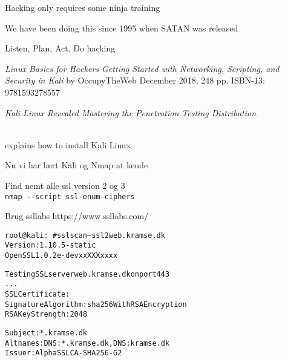 \documentclass[Screen16to9,17pt]{foils}
\begin{document}
\begin{list2}
\item Hacking only requires some ninja training
\item We have been doing this since 1995 when SATAN was released
\item Listen, Plan, Act, Do hacking
\end{list2}



\emph{Linux Basics for Hackers
Getting Started with Networking, Scripting, and Security in Kali}
by OccupyTheWeb
December 2018, 248 pp.
ISBN-13:
9781593278557




\emph{Kali Linux Revealed  Mastering the Penetration Testing Distribution}

\\
explains how to install Kali Linux






\begin{list1}
\item Nu vi har lært Kali og Nmap at kende
\begin{list2}
\item Find nemt alle ssl version 2 og 3\\
\verb+nmap --script ssl-enum-ciphers+
\item Brug ssllabs https://www.ssllabs.com/
\end{list2}
\end{list1}



\begin{alltt}\small
root@kali:~# sslscan --ssl2 web.kramse.dk
Version: 1.10.5-static
OpenSSL 1.0.2e-dev xx XXX xxxx

Testing SSL server web.kramse.dk on port 443
...
  SSL Certificate:
Signature Algorithm: sha256WithRSAEncryption
RSA Key Strength:    2048

Subject:  *.kramse.dk
Altnames: DNS:*.kramse.dk, DNS:kramse.dk
Issuer:   AlphaSSL CA - SHA256 - G2
\end{alltt}
\end{document}
